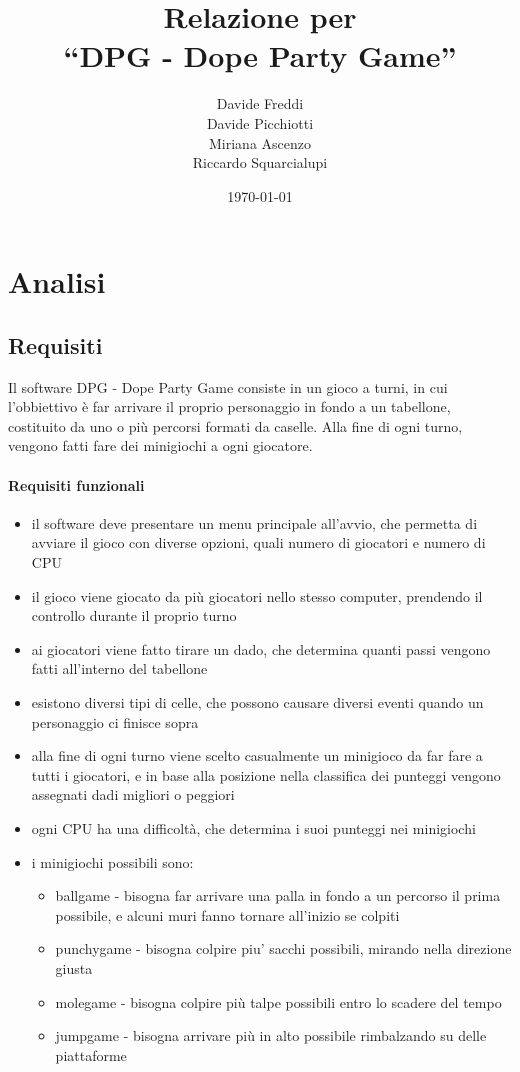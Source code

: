 \documentclass[a4paper,12pt]{report}
\title{Relazione per\\``DPG - Dope Party Game''}
\author{Davide Freddi\\Davide Picchiotti\\Miriana Ascenzo\\Riccardo Squarcialupi}
\date{\today}
\begin{document}
 
\maketitle

\tableofcontents

\chapter{Analisi}
\section{Requisiti}
Il software DPG - Dope Party Game consiste in un gioco a turni, in cui l'obbiettivo è far arrivare il proprio personaggio in fondo a un tabellone, costituito da uno o più percorsi formati da caselle.
%
Alla fine di ogni turno, vengono fatti fare dei minigiochi a ogni giocatore.

\subsubsection{Requisiti funzionali}
\begin{itemize}
	\item il software deve presentare un menu principale all'avvio, che permetta di avviare il gioco con diverse opzioni, quali numero di giocatori e numero di CPU
	\item il gioco viene giocato da più giocatori nello stesso computer, prendendo il controllo durante il proprio turno
	\item ai giocatori viene fatto tirare un dado, che determina quanti passi vengono fatti all'interno del tabellone
	\item esistono diversi tipi di celle, che possono causare diversi eventi quando un personaggio ci finisce sopra
	\item alla fine di ogni turno viene scelto casualmente un minigioco da far fare a tutti i giocatori, e in base alla posizione nella classifica dei punteggi vengono assegnati dadi migliori o peggiori
	\item ogni CPU ha una difficoltà, che determina i suoi punteggi nei minigiochi
	\item i minigiochi possibili sono:
	\begin{itemize}
	    \item ballgame - bisogna far arrivare una palla in fondo a un percorso il prima possibile, e alcuni muri fanno tornare all'inizio se colpiti
	    \item punchygame - bisogna colpire piu' sacchi possibili, mirando nella direzione giusta
	    \item molegame - bisogna colpire più talpe possibili entro lo scadere del tempo
	    \item jumpgame - bisogna arrivare più in alto possibile rimbalzando su delle piattaforme
	\end{itemize}
\end{itemize}
\end{document}
